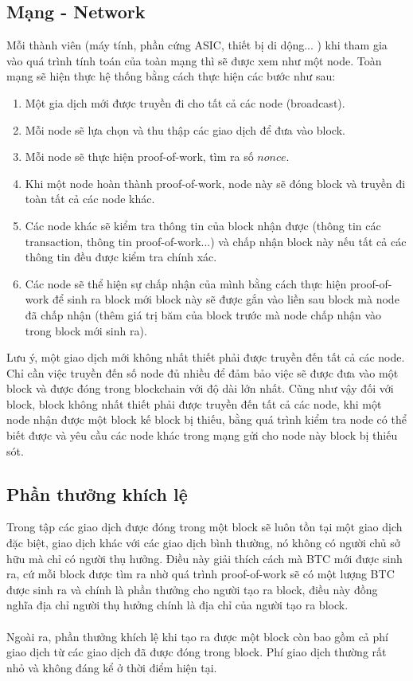 \subsection{Mạng - Network}
Mỗi thành viên (máy tính, phần cứng ASIC, thiết bị di dộng... ) khi tham gia vào quá 
trình tính toán của toàn mạng thì sẽ được xem như một node. Toàn mạng sẽ hiện thực hệ 
thống bằng cách thực hiện các bước như sau:
\begin{enumerate}
\item Một gia dịch mới được truyền đi cho tất cả các node (broadcast).
\item Mỗi node sẽ lựa chọn và thu thập các giao dịch để đưa vào block.
\item Mỗi node sẽ thực hiện proof-of-work, tìm ra số $nonce$.
\item Khi một node hoàn thành proof-of-work, node này sẽ đóng block và truyền 
đi toàn tất cả các node khác.
\item Các node khác sẽ kiểm tra thông tin của block nhận được (thông tin các 
transaction, thông tin proof-of-work...) và chấp nhận block này nếu tất cả 
các thông tin đều được kiểm tra chính xác.
\item Các node sẽ thể hiện sự chấp nhận của mình bằng cách thực hiện proof-of-work 
để sinh ra block mới block này sẽ được gắn vào liền sau block mà node đã chấp nhận 
(thêm giá trị băm của block trước mà node chấp nhận vào trong block mới sinh ra).
\end{enumerate}
Lưu ý, một giao dịch mới không nhất thiết phải được truyền đến tất cả các node. 
Chỉ cần việc truyền đến số node đủ nhiều để đảm bảo việc sẽ được đưa vào một block 
và được đóng trong blockchain với độ dài lớn nhất. Cũng như vậy đối với block, 
block không nhất thiết phải được truyền đến tất cả các node, khi một node nhận 
được một block kế block bị thiếu, bằng quá trình kiểm tra node có thể biết được 
và yêu cầu các node khác trong mạng gửi cho node này block bị thiếu sót.
\subsection{Phần thưởng khích lệ}
Trong tập các giao dịch được đóng trong một block sẽ luôn tồn tại một giao dịch 
đặc biệt, giao dịch khác với các giao dịch bình thường, nó không có người chủ 
sở hữu mà chỉ có người thụ hưởng. Điều này giải thích cách mà BTC mới được sinh 
ra, cứ mỗi block được tìm ra nhờ quá trình proof-of-work sẽ có một lượng BTC 
được sinh ra và chính là phần thưởng cho người tạo ra block, điều này đồng nghĩa 
địa chỉ người thụ hưởng chính là địa chỉ của người tạo ra block.\\\\
Ngoài ra, phần thưởng khích lệ khi tạo ra được một block còn bao gồm cả phí giao 
dịch từ các giao dịch đã được đóng trong block. Phí giao dịch thường rất nhỏ và
không đáng kể ở thời điểm hiện tại.
